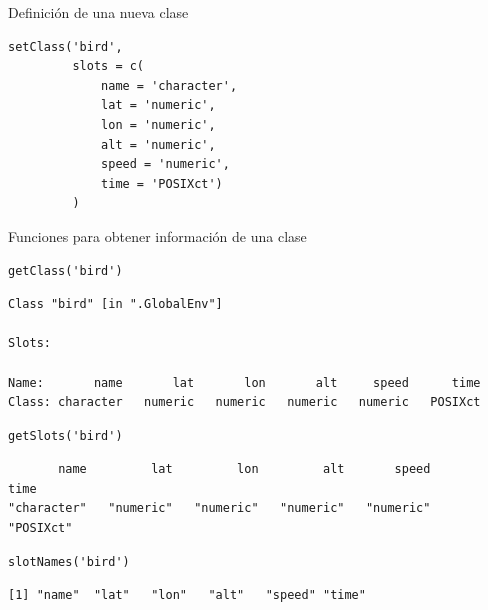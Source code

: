 \documentclass[xcolor={usenames,svgnames,dvipsnames}]{beamer}
\begin{document}
\begin{frame}[label={sec:org977236e},fragile]{Definición de una nueva clase}
 \lstset{language=r,label= ,caption= ,captionpos=b,numbers=none}
\begin{lstlisting}
setClass('bird',
         slots = c(
             name = 'character',
             lat = 'numeric',
             lon = 'numeric',
             alt = 'numeric',
             speed = 'numeric',
             time = 'POSIXct')
         )
\end{lstlisting}
\end{frame}

\begin{frame}[label={sec:org4bc8440},fragile]{Funciones para obtener información de una clase}
 \lstset{language=r,label= ,caption= ,captionpos=b,numbers=none}
\begin{lstlisting}
getClass('bird')
\end{lstlisting}

\begin{verbatim}
Class "bird" [in ".GlobalEnv"]

Slots:
                                                                  
Name:       name       lat       lon       alt     speed      time
Class: character   numeric   numeric   numeric   numeric   POSIXct
\end{verbatim}


\lstset{language=r,label= ,caption= ,captionpos=b,numbers=none}
\begin{lstlisting}
getSlots('bird')
\end{lstlisting}

\begin{verbatim}
       name         lat         lon         alt       speed        time 
"character"   "numeric"   "numeric"   "numeric"   "numeric"   "POSIXct"
\end{verbatim}


\lstset{language=r,label= ,caption= ,captionpos=b,numbers=none}
\begin{lstlisting}
slotNames('bird')
\end{lstlisting}

\begin{verbatim}
[1] "name"  "lat"   "lon"   "alt"   "speed" "time"
\end{verbatim}
\end{frame}
\end{document}
